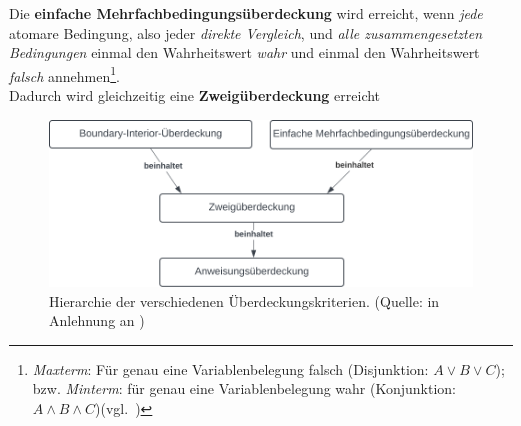 \begin{tcolorbox}[title=Einfache Mehrfachbedingungsüberdeckung]
    Die \textbf{einfache Mehrfachbedingungsüberdeckung} wird erreicht, wenn \textit{jede} atomare Bedingung, also jeder \textit{direkte Vergleich}, und \textit{alle zusammengesetzten Bedingungen} einmal den Wahrheitswert \textit{wahr} und einmal den Wahrheitswert \textit{falsch} annehmen\footnote{
        \textit{Maxterm}: Für genau eine Variablenbelegung falsch (Disjunktion: $A \lor B \lor C$); bzw. \textit{Minterm}: für genau eine Variablenbelegung wahr (Konjunktion: $A \land B \land C$)(vgl.~\cite[92]{Hof22})
    }.\\
    Dadurch wird gleichzeitig eine \textbf{Zweigüberdeckung} erreicht
\end{tcolorbox}

\begin{figure}
    \centering
    \includegraphics[scale=0.4]{part four/Testende Verfahren/img/coverage-criteria-hierarchy}
    \caption{Hierarchie der verschiedenen Überdeckungskriterien. (Quelle: in Anlehnung an \cite[Abb. 5.2, 53]{Wed09c})}
    \label{fig:coverage-criteria-hierarchy-cc}
\end{figure}